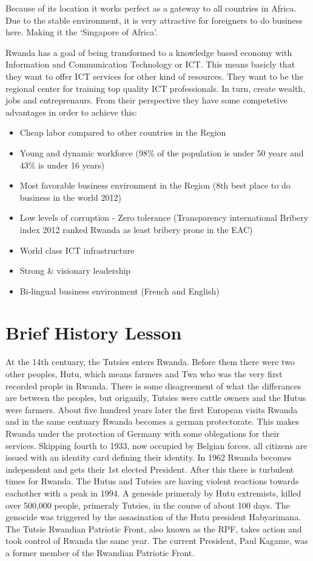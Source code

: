 Because of its location it works perfect as a gateway to all countries in Africa. 
Due to the stable environment, it is very attractive for foreigners to do business here. 
Making it the `Singapore of Africa'.

Rwanda has a goal of being transformed to a knowledge based economy with Information and Communication Technology or ICT. 
This means basicly that they want to offer ICT services for other kind of resources. 
They want to be the regional center for training top quality ICT professionals.
In turn, create wealth, jobs and entreprenaurs. 
From their perspective they have some competetive advantages in order to achieve this:
\begin{itemize}
\item Cheap labor compared to other countries in the Region
\item Young and dynamic workforce (98\% of the population is under 50 years and 43\% is under 16 years)
\item Most favorable business environment in the Region (8th best place to do business in the world 2012)
\item Low levels of corruption - Zero tolerance (Transparency international Bribery index 2012 ranked Rwanda as least bribery prone in the EAC)
\item World class ICT infrastructure
\item Strong \& visionary leadership
\item Bi-lingual business environment (French and English)
\end{itemize}
\cite{2}

\section{Brief History Lesson}
At the 14th centuary, the Tutsies enters Rwanda. 
Before them there were two other peoples, Hutu, which means farmers and Twa who was the very first recorded prople in Rwanda.
There is some disagreement of what the differances are between the peoples, but origanily, Tutsies were cattle owners and the Hutus were farmers. 
About five hundred years later the first European visits Rwanda and in the same centuary Rwanda becomes a german protectorate. 
This makes Rwanda under the protection of Germany with some oblegations for their services.
Skipping fourth to 1933, now occupied by Belgian forces, all citizens are issued with an identity card defining their identity.
In 1962 Rwanda becomes independent and gets their 1st elected President. 
After this there is turbulent times for Rwanda. The Hutus and Tutsies are having violent reactions towards eachother with a peak in 1994.
A geneside primeraly by Hutu extremists, killed over 500,000 people, primeraly Tutsies, in the course of about 100 days. 
The genocide was triggered by the assasination of the Hutu president Habyarimana.  
The Tutsie Rwandian Patriotic Front, also known as the RPF, takes action and took control of Rwanda the same year.
The current President, Paul Kagame, was a former member of the Rwandian Patriotic Front.
\cite{17}\cite{18}\cite{19}

